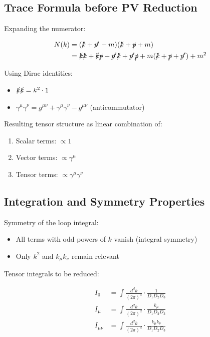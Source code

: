 	\subsection{Trace Formula before PV Reduction}
	
	Expanding the numerator:
	
	\begin{align}
		N(k) &= (\slashed{k} + \slashed{p'} + m)(\slashed{k} + \slashed{p} + m)\\
		&= \slashed{k}\slashed{k} + \slashed{k}\slashed{p} + \slashed{p'}\slashed{k} + \slashed{p'}\slashed{p} + m(\slashed{k} + \slashed{p} + \slashed{p'}) + m^2
	\end{align}
	
	Using Dirac identities:
	\begin{itemize}
		\item $\slashed{k}\slashed{k} = k^2 \cdot 1$
		\item $\gamma^\mu\gamma^\nu = g^{\mu\nu} + \gamma^\mu\gamma^\nu - g^{\mu\nu}$ (anticommutator)
	\end{itemize}
	
	Resulting tensor structure as linear combination of:
	\begin{enumerate}
		\item Scalar terms: $\propto 1$
		\item Vector terms: $\propto \gamma^\mu$  
		\item Tensor terms: $\propto \gamma^\mu\gamma^\nu$
	\end{enumerate}
	
	\subsection{Integration and Symmetry Properties}
	
	Symmetry of the loop integral:
	\begin{itemize}
		\item All terms with odd powers of $k$ vanish (integral symmetry)
		\item Only $k^2$ and $k_\mu k_\nu$ remain relevant
	\end{itemize}
	
	Tensor integrals to be reduced:
	
	\begin{align}
		I_0 &= \int \frac{d^d k}{(2\pi)^d} \cdot \frac{1}{D_1 D_2 D_3}\\
		I_\mu &= \int \frac{d^d k}{(2\pi)^d} \cdot \frac{k_\mu}{D_1 D_2 D_3}\\
		I_{\mu\nu} &= \int \frac{d^d k}{(2\pi)^d} \cdot \frac{k_\mu k_\nu}{D_1 D_2 D_3}
	\end{align}
	
